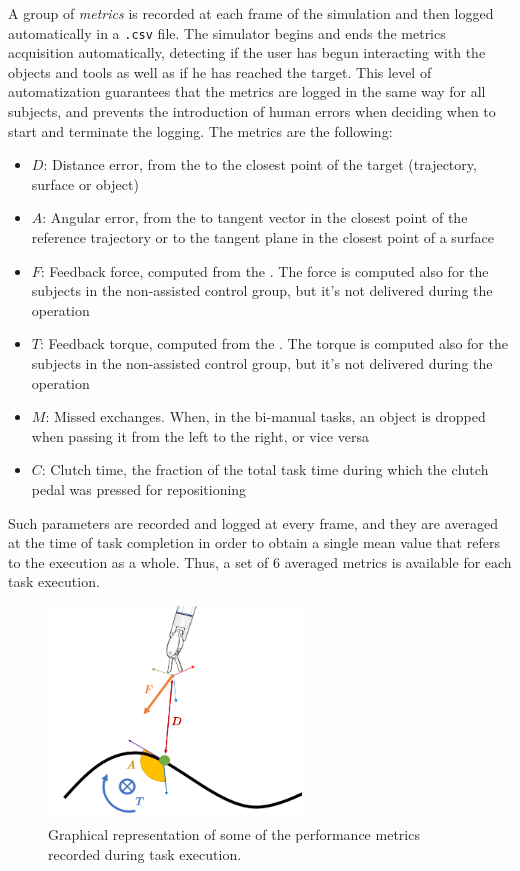 \documentclass[../main.tex]{subfiles}
\begin{document}
A group of \textit{metrics} is recorded at each frame of the simulation and then logged automatically in a \texttt{.csv} file. The simulator begins and ends the metrics acquisition automatically, detecting if the user has begun interacting with the objects and tools as well as if he has reached the target. This level of automatization guarantees that the metrics are logged in the same way for all subjects, and prevents the introduction of human errors when deciding when to start and terminate the logging. The metrics are the following:
\begin{itemize}
    \item $D$: Distance error, from the \ee to the closest point of the target (trajectory, surface or object)
    \item $A$: Angular error, from the \ee to tangent vector in the closest point of the reference trajectory or to the tangent plane in the closest point of a surface
    \item $F$: Feedback force, computed from the \vf. The force is computed also for the subjects in the non-assisted control group, but it's not delivered during the operation
    \item $T$: Feedback torque, computed from the \vf. The torque is computed also for the subjects in the non-assisted control group, but it's not delivered during the operation
    \item $M$: Missed exchanges. When, in the bi-manual tasks, an object is dropped when passing it from the left \psm to the right, or vice versa
    \item $C$: Clutch time, the fraction of the total task time during which the clutch pedal was pressed for repositioning
\end{itemize}  

Such parameters are recorded and logged at every frame, and they are averaged at the time of task completion in order to obtain a single mean value that refers to the execution as a whole. Thus, a set of 6 averaged metrics is available for each task execution.

\begin{figure}
    \centering
    \includegraphics[width=0.6\textwidth]{images/metrics.png}
    \caption{Graphical representation of some of the performance metrics recorded during task execution. }
    \label{fig:metrics}
\end{figure}
\end{document}

